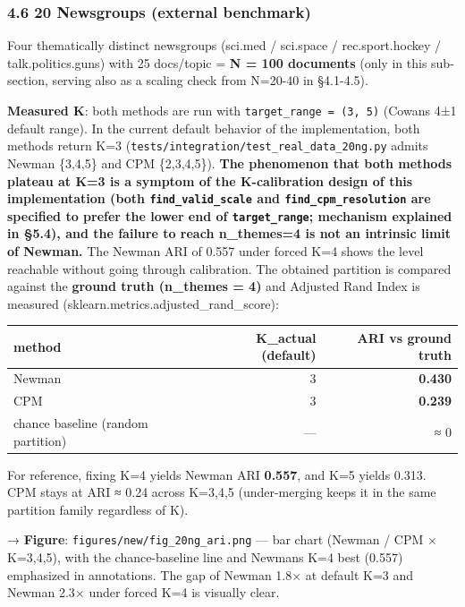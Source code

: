\documentclass[
]{article}
\newcounter{none} %
\begin{document}
\subsubsection{4.6 20 Newsgroups (external
benchmark)}\label{46-20-newsgroups-external-benchmark}

Four thematically distinct newsgroups (sci.med / sci.space /
rec.sport.hockey / talk.politics.guns) with 25 docs/topic = \textbf{N =
100 documents} (only in this sub-section, serving also as a scaling
check from N=20-40 in §4.1-4.5).

\textbf{Measured K}: both methods are run with
\texttt{target\_range\ =\ (3,\ 5)} (Cowan\textquotesingle s 4±1 default
range). In the current default behavior of the implementation, both
methods return K=3 (\texttt{tests/integration/test\_real\_data\_20ng.py}
admits Newman \{3,4,5\} and CPM \{2,3,4,5\}). \textbf{The phenomenon
that both methods plateau at K=3 is a symptom of the K-calibration
design of this implementation (both \texttt{find\_valid\_scale} and
\texttt{find\_cpm\_resolution} are specified to prefer the lower end of
\texttt{target\_range}; mechanism explained in §5.4), and the failure to
reach n\_themes=4 is not an intrinsic limit of Newman.} The Newman ARI
of 0.557 under forced K=4 shows the level reachable without going
through calibration. The obtained partition is compared against the
\textbf{ground truth (n\_themes = 4)} and Adjusted Rand Index is
measured (sklearn.metrics.adjusted\_rand\_score):

{\def\LTcaptype{none} %
\begin{longtable}[]{@{}lrr@{}}
\toprule\noalign{}
method & K\_actual (default) & ARI vs ground truth \\
\midrule\noalign{}
\endhead
\bottomrule\noalign{}
\endlastfoot
Newman & 3 & \textbf{0.430} \\
CPM & 3 & \textbf{0.239} \\
chance baseline (random partition) & --- & ≈ 0 \\
\end{longtable}
}

For reference, fixing K=4 yields Newman ARI \textbf{0.557}, and K=5
yields 0.313. CPM stays at ARI ≈ 0.24 across K=3,4,5 (under-merging
keeps it in the same partition family regardless of K).

→ \textbf{Figure}: \texttt{figures/new/fig\_20ng\_ari.png} --- bar chart
(Newman / CPM × K=3,4,5), with the chance-baseline line and
Newman\textquotesingle s K=4 best (0.557) emphasized in annotations. The
gap of Newman 1.8× at default K=3 and Newman 2.3× under forced K=4 is
visually clear.
\end{document}
